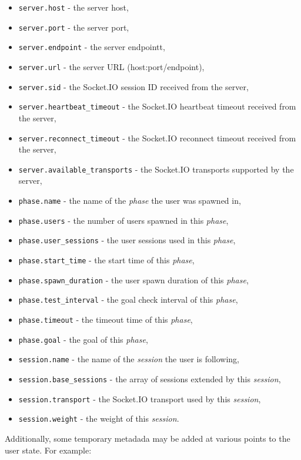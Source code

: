 \documentclass[a4paper]{article}
\begin{document}
\begin{itemize}
\item \texttt{server.host} - the server host,
\item \texttt{server.port} - the server port,
\item \texttt{server.endpoint} - the server endpointt,
\item \texttt{server.url} - the server URL (host:port/endpoint),
\item \texttt{server.sid} - the Socket.IO session ID received from the server,
\item \texttt{server.heartbeat\_timeout} - the Socket.IO heartbeat timeout received from the server,
\item \texttt{server.reconnect\_timeout} - the Socket.IO reconnect timeout received from the server,
\item \texttt{server.available\_transports} - the Socket.IO transports supported by the server,
\item \texttt{phase.name} - the name of the \emph{phase} the user was spawned in,
\item \texttt{phase.users} - the number of users spawned in this \emph{phase},
\item \texttt{phase.user\_sessions} - the user sessions used in this \emph{phase},
\item \texttt{phase.start\_time} - the start time of this \emph{phase},
\item \texttt{phase.spawn\_duration} - the user spawn duration of this \emph{phase},
\item \texttt{phase.test\_interval} - the goal check interval of this \emph{phase},
\item \texttt{phase.timeout} - the timeout time of this \emph{phase},
\item \texttt{phase.goal} - the goal of this \emph{phase},
\item \texttt{session.name} - the name of the \emph{session} the user is following,
\item \texttt{session.base\_sessions} - the array of sessions extended by this \emph{session},
\item \texttt{session.transport} - the Socket.IO transport used by this \emph{session},
\item \texttt{session.weight} - the weight of this \emph{session}.
\end{itemize}

\noindent
Additionally, some temporary metadada may be added at various points to the user state. For example:
\end{document}
